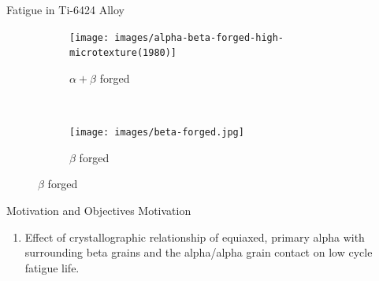 \documentclass[10pt]{beamer}
\begin{document}
{%
\begin{frame}[fragile]{Fatigue in Ti-6424 Alloy}

\begin{figure}[H]
    \centering
    \begin{subfigure}{0.40\textwidth}
        \texttt{[image: images/alpha-beta-forged-high-microtexture(1980)]}
        \caption{\tiny  $\alpha+\beta$ forged}
        \label{fig:Ti-6242 Surface}
    \end{subfigure}
    ~
    \begin{subfigure}{0.40\textwidth}
        \texttt{[image: images/beta-forged.jpg]}
        \caption{\tiny $\beta$ forged}
        \label{fig:Ti-6242 Surface}
    \end{subfigure}  
\end{figure}      

\vspace{-10mm}  
  
\begin{table}[]
\end{table}
    
\end{frame}
}

{%
\begin{frame}[fragile]{Motivation and Objectives}
Motivation
\begin{enumerate}

\item Effect of crystallographic relationship of equiaxed, primary alpha with surrounding beta grains and the alpha/alpha grain contact on low cycle fatigue life.
\end{enumerate}

\end{frame}
}
\end{document}
